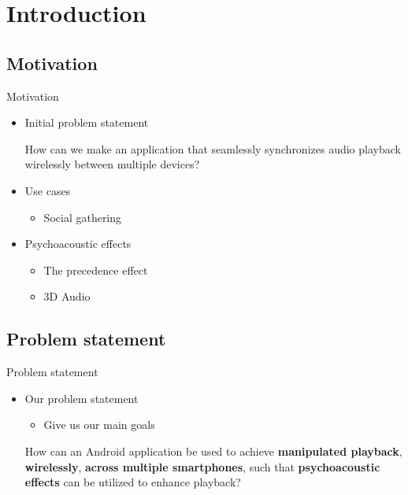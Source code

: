 \section{Introduction}
\author{Thomas}
\subsection{Motivation}

\begin{frame}{Motivation}
    \begin{itemize}
        \item<1-> Initial problem statement

        \begin{problemstatement}
            \scriptsize How can we make an application that seamlessly synchronizes audio playback wirelessly between multiple devices?
        \end{problemstatement}

        \item<2-> Use cases
        \begin{itemize}
            \item Social gathering
        \end{itemize}
        \item<3-> Psychoacoustic effects
        \begin{itemize}
            \item The precedence effect
            \item 3D Audio
        \end{itemize}
    \end{itemize}


\end{frame}

\subsection{Problem statement}
\begin{frame}{Problem statement}

    \begin{itemize}

        \item<1-> Our problem statement
        \begin{itemize}
            \item Give us our main goals
        \end{itemize}

        \begin{problemstatement}

        \scriptsize How can an Android application be used to achieve \textbf{manipulated playback}, \textbf{wirelessly},
\textbf{across multiple smartphones}, such that \textbf{psychoacoustic effects} can be utilized to enhance playback?
        \end{problemstatement}

    \end{itemize}
\end{frame}

